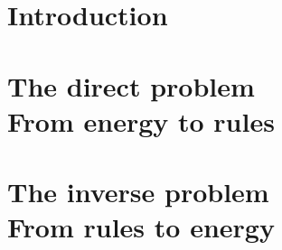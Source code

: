 \documentclass[phd,lfcs]{infthesis}
\begin{document}
\chapter{Introduction}
\label{chp:intro}


\chapter[The direct problem: From energy to rules]{
  The direct problem \\
  \LARGE From energy to rules}
\label{chp:direct}


\chapter[The inverse problem: From rules to energy]{
  The inverse problem \\
  \LARGE From rules to energy}
\label{chp:inverse}



% 

\singlespace

% 

\printbibliography[heading=bibintoc]

\end{document}
